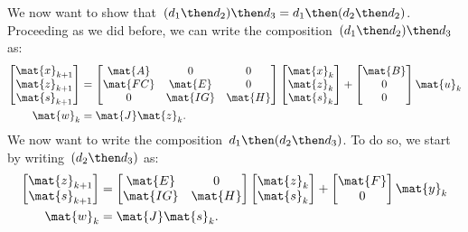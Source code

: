We now want to show that~$(d_1\then d_2)\then d_3=d_1\then (d_2\then d_2)$. Proceeding as we did before, we can write the composition~$(d_1\then d_2)\then d_3$ as:
\begin{equation*}
  \label{eq:dlin-5}
  \begin{aligned}
    \begin{bmatrix}
      \mat{x}_{k+1}\\
      \mat{z}_{k+1}\\
      \mat{s}_{k+1}
    \end{bmatrix}&=
    \begin{bmatrix}
      \mat{A}&0&0\\
      \mat{FC}&\mat{E}&0\\
      0&\mat{IG}&\mat{H}
    \end{bmatrix}\begin{bmatrix}
                   \mat{x}_k\\ \mat{z}_k\\ \mat{s}_k
    \end{bmatrix}+
    \begin{bmatrix}
      \mat{B}\\ 0\\ 0
    \end{bmatrix}\mat{u}_k\\
    \mat{w}_k&=\mat{J}\mat{z}_k.
  \end{aligned}
\end{equation*}
We now want to write the composition~$d_1\then (d_2\then d_3)$. To do so, we start by writing~$(d_2\then d_3)$ as:
\begin{equation*}
  \label{eq:dlin-6}
  \begin{aligned}
    \begin{bmatrix}
      \mat{z}_{k+1}\\
      \mat{s}_{k+1}
    \end{bmatrix}&=
    \begin{bmatrix}
      \mat{E}&0\\
      \mat{IG}&\mat{H}
    \end{bmatrix}\begin{bmatrix}
                   \mat{z}_k\\ \mat{s}_k
    \end{bmatrix}+
    \begin{bmatrix}
      \mat{F}\\ 0
    \end{bmatrix}\mat{y}_k\\
    \mat{w}_k&=\mat{J}\mat{s}_k.
  \end{aligned}
\end{equation*}
